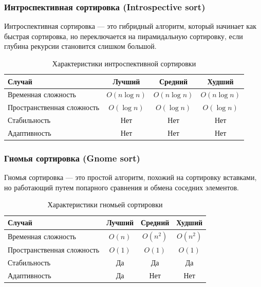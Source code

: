 \documentclass[a4paper,12pt]{article}
\begin{document}
\subsubsection{Интроспективная сортировка (Introspective sort)}
\label{subsubsec:интроспективная-сортировка-introspective-sort}

Интроспективная сортировка --- это гибридный алгоритм, который начинает как быстрая сортировка, но переключается на пирамидальную сортировку, если глубина рекурсии становится слишком большой.

\begin{table}[H]
    \centering
    \begin{tabular}{|l|c|c|c|}
        \hline
        Случай & Лучший & Средний & Худший \\
        \hline
        Временная сложность & $O(n \log n)$ & $O(n \log n)$ & $O(n \log n)$ \\
        \hline
        Пространственная сложность & $O(\log n)$ & $O(\log n)$ & $O(\log n)$ \\
        \hline
        Стабильность & Нет & Нет & Нет \\
        \hline
        Адаптивность & Нет & Нет & Нет \\
        \hline
    \end{tabular}
    \caption{Характеристики интроспективной сортировки}
\end{table}

\subsubsection{Гномья сортировка (Gnome sort)}
\label{subsubsec:гномья-сортировка-gnome-sort}

Гномья сортировка --- это простой алгоритм, похожий на сортировку вставками, но работающий путем попарного сравнения и обмена соседних элементов.

\begin{table}[H]
    \centering
    \begin{tabular}{|l|c|c|c|}
        \hline
        Случай & Лучший & Средний & Худший \\
        \hline
        Временная сложность & $O(n)$ & $O(n^2)$ & $O(n^2)$ \\
        \hline
        Пространственная сложность & $O(1)$ & $O(1)$ & $O(1)$ \\
        \hline
        Стабильность & Да & Да & Да \\
        \hline
        Адаптивность & Да & Нет & Нет \\
        \hline
    \end{tabular}
    \caption{Характеристики гномьей сортировки}
\end{table}
\end{document}
